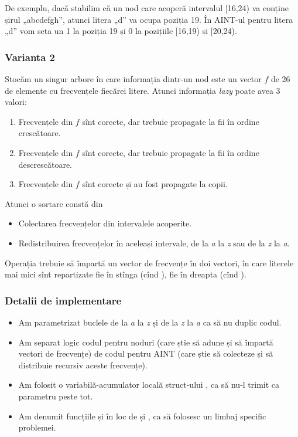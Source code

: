 De exemplu, dacă stabilim că un nod care acoperă intervalul [16,24) va conține șirul „abcdefgh”, atunci litera „d” va ocupa poziția 19. În AINT-ul pentru litera „d” vom seta un 1 la poziția 19 și 0 la pozițiile [16,19) și [20,24).

\subsubsection*{Varianta 2}

Stocăm un singur arbore în care informația dintr-un nod este un vector $f$ de 26 de elemente cu frecvențele fiecărei litere. Atunci informația \textit{lazy} poate avea 3 valori:

\begin{enumerate}
  \item Frecvențele din $f$ sînt corecte, dar trebuie propagate la fii în ordine crescătoare.

  \item Frecvențele din $f$ sînt corecte, dar trebuie propagate la fii în ordine descrescătoare.

  \item Frecvențele din $f$ sînt corecte și au fost propagate la copii.
\end{enumerate}

Atunci o sortare constă din

\begin{itemize}
  \item Colectarea frecvențelor din intervalele acoperite.

  \item Redistribuirea frecvențelor în aceleași intervale, de la \textit{a} la \textit{z} sau de la \textit{z} la \textit{a}.
\end{itemize}

Operația  trebuie să împartă un vector de frecvențe în doi vectori, în care literele mai mici sînt repartizate fie în stînga (cînd ), fie în dreapta (cînd ).

\subsubsection*{Detalii de implementare}

\begin{itemize}
  \item Am parametrizat buclele de la \textit{a} la \textit{z} și de la \textit{z} la \textit{a} ca să nu duplic codul.

  \item Am separat logic codul pentru noduri (care știe să adune și să împartă vectori de frecvențe) de codul pentru AINT (care știe să colecteze și să distribuie recursiv aceste frecvențe).

  \item Am folosit o variabilă-acumulator locală struct-ului , ca să nu-l trimit ca parametru peste tot.

  \item Am denumit funcțiile  și  în loc de  și , ca să folosesc un limbaj specific problemei.
\end{itemize}


